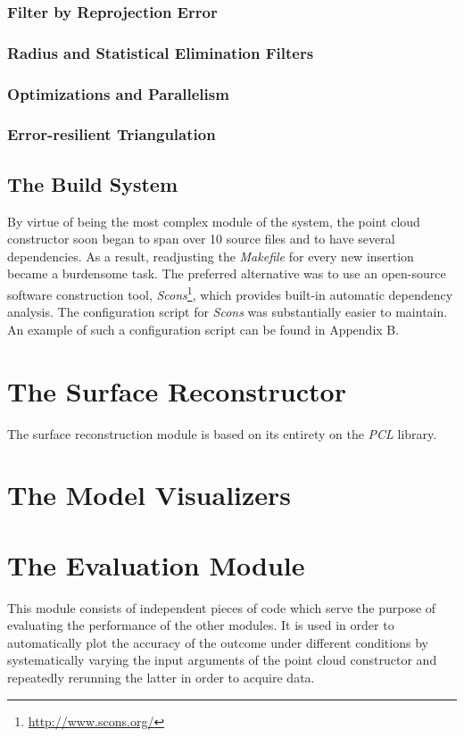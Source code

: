 \documentclass[12pt,a4paper,twoside,openright]{report}
\begin{document}
\subsubsection{Filter by Reprojection Error}
\subsubsection{Radius and Statistical Elimination Filters}
\subsubsection{Optimizations and Parallelism}
\subsubsection{Error-resilient Triangulation}

\subsection{The Build System}
By virtue of being the most complex module of the system, the point cloud constructor soon began to span over 10 source files and to have several dependencies. As a result, readjusting the \emph{Makefile} for every new insertion became a burdensome task. The preferred alternative was to use an open-source software construction tool, \emph{Scons}\footnote{\url{http://www.scons.org/}}, which provides built-in automatic dependency analysis. The configuration script for \emph{Scons} was substantially easier to maintain. An example of such a configuration script can be found in Appendix B.

\section{The Surface Reconstructor}
The surface reconstruction module is based on its entirety on the \emph{PCL} library. 

\section{The Model Visualizers}


\section{The Evaluation Module}
This module consists of independent pieces of code which serve the purpose of evaluating the performance of the other modules. It is used in order to automatically plot the accuracy of the outcome under different conditions by systematically varying the input arguments of the point cloud constructor and repeatedly rerunning the latter in order to acquire data. 
\end{document}
